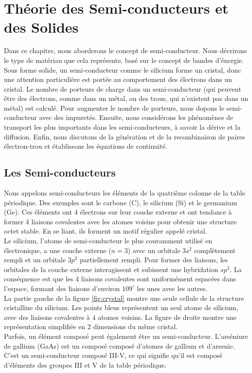 \chapter{Théorie des Semi-conducteurs et des Solides}
Dans ce chapitre, nous aborderons le concept de semi-conducteur. Nous décrirons le type de matériau que cela représente, basé sur le concept de bandes d'énergie. Sous forme solide, un semi-conducteur comme le silicium forme un cristal, donc une attention particulière est portée au comportement des électrons dans un cristal. Le nombre de porteurs de charge dans un semi-conducteur (qui peuvent être des électrons, comme dans un métal, ou des trous, qui n'existent pas dans un métal) est calculé. Pour augmenter le nombre de porteurs, nous dopons le semi-conducteur avec des impuretés. Ensuite, nous considérons les phénomènes de transport les plus importants dans les semi-conducteurs, à savoir la dérive et la diffusion. Enfin, nous discutons de la génération et de la recombinaison de paires électron-trou et établissons les équations de continuité.
\section{Les Semi-conducteurs}
Nous appelons semi-conducteurs les éléments de la quatrième colonne de la table périodique. Des exemples sont le carbone (C), le silicium (Si) et le germanium (Ge). Ces éléments ont 4 électrons sur leur couche externe et ont tendance à former 4 liaisons covalentes avec les atomes voisins pour obtenir une structure octet stable. En se liant, ils forment un motif régulier appelé cristal.\\
Le silicium, l'atome de semi-conducteur le plus couramment utilisé en électronique, a une couche externe ($n=3$) avec un orbitale $3s^2$ complètement rempli et un orbitale $3p^2$ partiellement rempli. Pour former des liaisons, les orbitales de la couche externe interagissent et subissent une hybridation $sp^3$. La conséquence est que les 4 liaisons covalentes sont uniformément espacées dans l'espace, formant des liaisons d'environ $109^{\circ}$ les unes avec les autres.\\
La partie gauche de la figure \ref{fig:crystal} montre une seule cellule de la structure cristalline du silicium. Les points bleus représentent un seul atome de silicium, avec des liaisons covalentes à $4$ atomes voisins. La figure de droite montre une représentation simplifiée en 2 dimensions du même cristal.\\
Parfois, un élément composé peut également être un semi-conducteur. L'arséniure de gallium (GaAs) est un composé composé d'atomes de gallium et d'arsenic. C'est un semi-conducteur composé III-V, ce qui signifie qu'il est composé d'éléments des groupes III et V de la table périodique.

